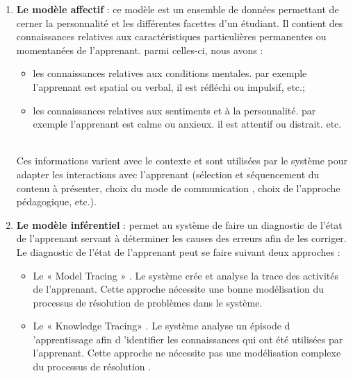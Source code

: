 \begin{enumerate}
    \item \textbf{Le modèle affectif} :  ce modèle est un ensemble de données permettant de cerner la personnalité et les différentes facettes d'un étudiant. Il contient des connaissances relatives aux caractéristiques particulières permanentes ou momentanées de l'apprenant. parmi celles-ci, nous avons :
    
\begin{itemize}
\item  les connaissances relatives aux conditions mentales. par exemple l'apprenant est
			spatial ou verbal, il est réfléchi ou impulsif, etc.;
\item les connaissances relatives aux sentiments et à la personnalité. par exemple
			l'apprenant est calme ou anxieux. il est attentif ou distrait. etc. \\\
\end{itemize}
Ces informations varient avec le contexte et sont utilisées par le système pour adapter les interactions avec l'apprenant (sélection et séquencement du contenu à présenter, choix du mode de communication , choix de l'approche pédagogique, etc.).
    \item \textbf{Le modèle inférentiel} : permet au système de faire un diagnostic de l'état de l'apprenant servant à déterminer les causes des erreurs afin
de les corriger. Le diagnostic de l'état de l'apprenant peut se faire suivant deux
approches : 
    \begin{itemize}
        \item Le « Model Tracing » . Le système crée et analyse la trace des activités de l'apprenant. Cette approche nécessite une bonne modélisation du processus de résolution de problèmes dans le système. 
        \item Le « Knowledge Tracing» . Le système analyse un épisode d 'apprentissage afin d 'identifier les connaissances qui ont été utilisées par l'apprenant. Cette approche ne nécessite pas une modélisation complexe du processus de résolution . 
    \end{itemize}


\end{enumerate}
